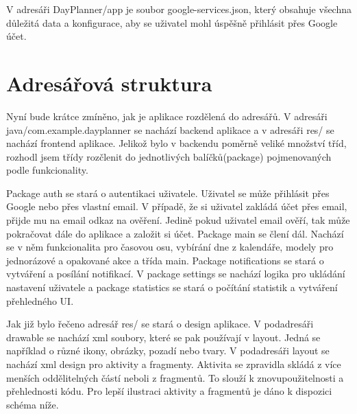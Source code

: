 V adresáři DayPlanner/app je soubor google-services.json, který obsahuje všechna důležitá data a konfigurace, aby se uživatel mohl úspěšně přihlásit přes Google účet.

\newpage
\section{Adresářová struktura}
\hspace{14pt} Nyní bude krátce zmíněno, jak je aplikace rozdělená do adresářů. V adresáři java/com.example.dayplanner se nachází backend aplikace a v adresáři res/ se nachází frontend aplikace. Jelikož bylo v backendu poměrně veliké množství tříd, rozhodl jsem třídy rozčlenit do jednotlivých balíčků(package) pojmenovaných podle funkcionality. 


Package auth se stará o autentikaci uživatele. Uživatel se může přihlásit přes Google nebo přes vlastní email. V případě, že si uživatel zakládá účet přes email, přijde mu na email odkaz na ověření. Jedině pokud uživatel email ověří, tak může pokračovat dále do aplikace a založit si účet. Package main se člení dál. Nachází se v něm funkcionalita pro časovou osu, vybírání dne z kalendáře, modely pro jednorázové a opakované akce a třída main. Package notifications se stará o vytváření a posílání notifikací. V package settings se nachází logika pro ukládání nastavení uživatele a package statistics se stará o počítání statistik a vytváření přehledného UI.

Jak již bylo řečeno adresář res/ se stará o design aplikace. V podadresáři drawable se nachází xml soubory, které se pak používají v layout. Jedná se například o různé ikony, obrázky, pozadí nebo tvary. V podadresáři layout se nachází xml design pro aktivity a fragmenty. Aktivita se zpravidla skládá z více menších oddělitelných částí neboli z fragmentů. To slouží k znovupoužitelnosti a přehlednosti kódu. Pro lepší ilustraci aktivity a fragmentů je dáno k dispozici schéma níže. 

